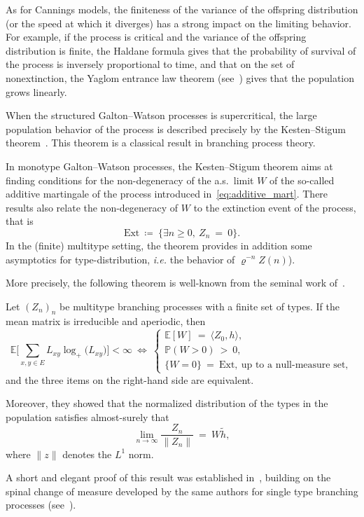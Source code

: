 As for Cannings models, the finiteness of the variance of the offspring distribution (or the speed at which it diverges) has a strong impact on the limiting behavior. For example, if the process is critical and the variance of the offspring distribution is finite, the Haldane formula gives that the probability of survival of the process is inversely proportional to time, and that on the set of nonextinction, the Yaglom entrance law theorem (see~\cite{Yaglom}) gives that the population grows linearly. 

\medskip

When the structured Galton--Watson processes is supercritical, the large population behavior of the process is described precisely by the Kesten--Stigum theorem~\cite{kesten_limit_1966}. This theorem is a classical result in branching process theory.


In monotype Galton--Watson processes, the Kesten--Stigum theorem aims at finding conditions for the non-degeneracy of the a.s.\ limit $W$ of the so-called additive martingale of the process introduced in~\eqref{eq:additive_mart}. There results also relate the non-degeneracy of $W$ to the extinction event of the process, that is
\[
\mathrm{Ext}\ \coloneqq\ \{\exists n \geq 0,\ Z_n \ =\ 0\}.
\]
In the (finite) multitype setting, the theorem provides in 
addition some asymptotics for type-distribution, \textit{i.e.} the behavior of $\varrho^{-n}Z(n)$).

More precisely, the following theorem is well-known from the seminal work of~\cite{kesten_limit_1966}.
\begin{thm}
Let $(Z_n)_{n}$ be multitype branching processes with a finite set of types. If the mean matrix is irreducible and aperiodic, then
\begin{equation*}
   \mathbb{E}\bigg[\sum_{x,y\in E}L_{xy}\log_+\big(L_{xy}\big)\bigg]<\infty \ \Longleftrightarrow\  \begin{cases}
    \mathbb{E}[W]\ =\ \langle Z_0, h\rangle, \\ \mathbb{P}(W>0)\ >\ 0, \\ \{W=0\}\ =\ \mathrm{Ext},\  \text{up to a null-measure set},
   \end{cases}
\end{equation*}
and the three items on the right-hand side are equivalent.

Moreover, they showed that the normalized distribution of the types in the population satisfies almost-surely that
\[
\lim_{n\to\infty}\frac{Z_n}{\lVert Z_n\rVert}\ =\ W\tilde{h},
\]
where $\lVert z \rVert$ denotes the $L^1$ norm.
\end{thm}
A short and elegant proof of this result was established in~\citet*{kurtz_conceptual_1997}, building on the spinal change of measure developed by the same authors for single type branching processes (see~\citet*{lyons_pemantle_peres_1995}).


